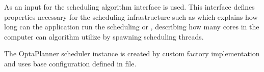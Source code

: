 As an input for the scheduling algorithm interface  is used.
This interface defines properties necessary for the scheduling infrastructure
such as  which explains how long can the application run the scheduling 
or , describing how many cores in the computer can algorithm utilize by spawning scheduling threads.

The OptaPlanner scheduler instance is created by custom factory implementation 
 and uses base configuration defined in  file.

